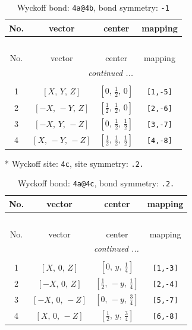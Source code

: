 \documentclass[fleqn,8pt]{jsarticle}
\begin{document}
\begin{longtable}{cccc}
\caption{Wyckoff bond: {\tt 4a@4b}, bond symmetry: {\tt -1}}
 \\
 \hline \hline
No. & vector & center & mapping \\ \hline \endfirsthead

\multicolumn{3}{l}{\tablename\ \thetable{}} \\
 \hline \hline
No. & vector & center & mapping \\ \hline \endhead

 \hline \hline
\multicolumn{3}{r}{\footnotesize\it continued ...} \\ \endfoot

 \hline \hline
\multicolumn{3}{r}{} \\ \endlastfoot

1 & $\left[ X,\, Y,\, Z \right]$ & $\left[ 0,\, \frac{1}{2},\, 0 \right]$ & {\tt [1,-5]} \\ \hline
2 & $\left[ - X,\, - Y,\, Z \right]$ & $\left[ \frac{1}{2},\, \frac{1}{2},\, 0 \right]$ & {\tt [2,-6]} \\ \hline
3 & $\left[ - X,\, Y,\, - Z \right]$ & $\left[ 0,\, \frac{1}{2},\, \frac{1}{2} \right]$ & {\tt [3,-7]} \\ \hline
4 & $\left[ X,\, - Y,\, - Z \right]$ & $\left[ \frac{1}{2},\, \frac{1}{2},\, \frac{1}{2} \right]$ & {\tt [4,-8]} \\
\end{longtable}
* Wyckoff site: {\tt 4c}, site symmetry: {\tt .2.}
\renewcommand{\arraystretch}{1.2}
\begin{longtable}{cccc}
\caption{Wyckoff bond: {\tt 4a@4c}, bond symmetry: {\tt .2.}}
 \\
 \hline \hline
No. & vector & center & mapping \\ \hline \endfirsthead

\multicolumn{3}{l}{\tablename\ \thetable{}} \\
 \hline \hline
No. & vector & center & mapping \\ \hline \endhead

 \hline \hline
\multicolumn{3}{r}{\footnotesize\it continued ...} \\ \endfoot

 \hline \hline
\multicolumn{3}{r}{} \\ \endlastfoot

1 & $\left[ X,\, 0,\, Z \right]$ & $\left[ 0,\, y,\, \frac{1}{4} \right]$ & {\tt [1,-3]} \\ \hline
2 & $\left[ - X,\, 0,\, Z \right]$ & $\left[ \frac{1}{2},\, - y,\, \frac{1}{4} \right]$ & {\tt [2,-4]} \\ \hline
3 & $\left[ - X,\, 0,\, - Z \right]$ & $\left[ 0,\, - y,\, \frac{3}{4} \right]$ & {\tt [5,-7]} \\ \hline
4 & $\left[ X,\, 0,\, - Z \right]$ & $\left[ \frac{1}{2},\, y,\, \frac{3}{4} \right]$ & {\tt [6,-8]} \\
\end{longtable}
\end{document}
